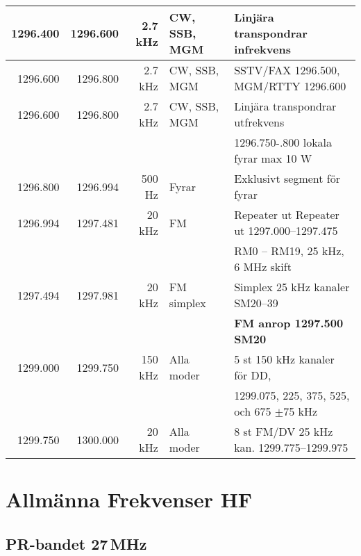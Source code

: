 \begin{tabular}{rrrll}
	         1296.400         & 1296.600      & 2.7 kHz     & CW, SSB, MGM    & Linjära transpondrar infrekvens                              \\ \hline
	         1296.600         & 1296.800      & 2.7 kHz     & CW, SSB, MGM    & SSTV/FAX 1296.500, MGM/RTTY 1296.600                         \\ \hline
	         1296.600         & 1296.800      & 2.7 kHz     & CW, SSB, MGM    & Linjära transpondrar utfrekvens                              \\
                                  &               &             &                 & 1296.750-.800 lokala fyrar max 10 W                          \\ \hline
	         1296.800         & 1296.994      & 500 Hz      & Fyrar           & Exklusivt segment för fyrar                                  \\ \hline
	         1296.994         & 1297.481      & 20 kHz      & FM              & Repeater ut Repeater ut 1297.000--1297.475                   \\
                                  &               &             &                 & RM0 – RM19, 25 kHz, 6 MHz skift                              \\ \hline
	         1297.494         & 1297.981      & 20 kHz      & FM simplex      & Simplex 25 kHz kanaler SM20--39                              \\
                                  &               &             &                 & \textbf{FM anrop 1297.500 SM20}                              \\ \hline
	         1299.000         & 1299.750      & 150 kHz     & Alla moder      & 5 st 150 kHz kanaler för DD,                                 \\
                                  &               &             &                 & 1299.075, 225, 375, 525, och 675 $\pm$75 kHz                 \\ \hline
	         1299.750         & 1300.000      & 20 kHz      & Alla moder      & 8 st FM/DV 25 kHz kan. 1299.775--1299.975
\end{tabular}
\normalsize

\clearpage

\section{Allmänna Frekvenser HF}

\subsection{PR-bandet 27\,MHz}

